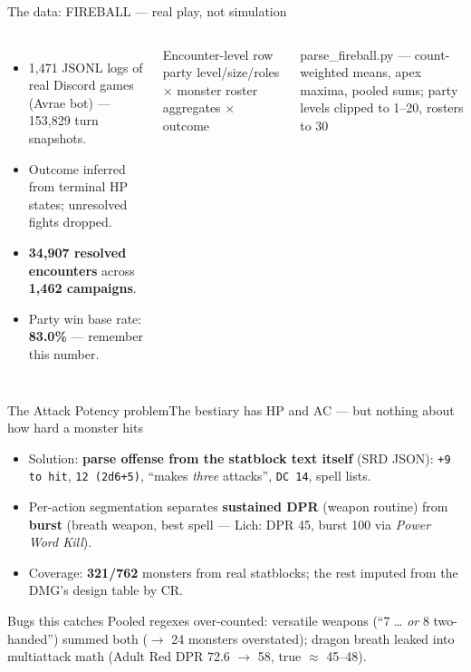 \documentclass[aspectratio=169,11pt]{beamer}
\newcommand{\srcnote}[1]{{\tiny\textcolor{sapienzaGray}{#1}}}
\begin{document}
\begin{frame}{The data: FIREBALL — real play, not simulation}
  \begin{columns}[T]
      \begin{itemize}
        \item 1{,}471 JSONL logs of real Discord games (Avrae bot) — 153{,}829 turn snapshots.
        \item Outcome inferred from terminal HP states; unresolved fights dropped.
        \item \textbf{34{,}907 resolved encounters} across \textbf{1{,}462 campaigns}.
        \item Party win base rate: \textbf{83.0\%} — remember this number.
      \end{itemize}
      \begin{block}{Encounter-level row}
        party level/size/roles $\times$ monster roster aggregates $\times$ outcome
      \end{block}
      \srcnote{parse\_fireball.py — count-weighted means, apex maxima, pooled sums; party levels clipped to 1–20, rosters to 30}
  \end{columns}
\end{frame}

\begin{frame}{The Attack Potency problem}{The bestiary has HP and AC — but nothing about how hard a monster hits}
  \begin{itemize}
    \item Solution: \textbf{parse offense from the statblock text itself} (SRD JSON):
          \texttt{+9 to hit}, \texttt{12 (2d6+5)}, ``makes \emph{three} attacks'', \texttt{DC 14}, spell lists.
    \item Per-action segmentation separates \textbf{sustained DPR} (weapon routine) from \textbf{burst} (breath weapon, best spell — Lich: DPR 45, burst 100 via \emph{Power Word Kill}).
    \item Coverage: \textbf{321/762} monsters from real statblocks; the rest imputed from the DMG's design table by CR.
  \end{itemize}
  \begin{exampleblock}{Bugs this catches}
    Pooled regexes over-counted: versatile weapons (``7 \ldots{} \emph{or} 8 two-handed'') summed both ($\to$ 24 monsters overstated); dragon breath leaked into multiattack math (Adult Red DPR 72.6 $\to$ 58, true $\approx$ 45–48).
  \end{exampleblock}
\end{frame}
\end{document}
